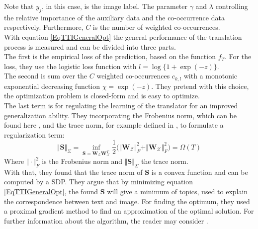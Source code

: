 Note that $y_j$, in this case, is the image label.
The parameter $\gamma$ and $\lambda$ controlling the relative importance of the auxiliary data and the co-occurrence data respectively.
Furthermore, $C$ is the number of weighted co-occurrences.\\
With equation \eqref{EqTTIGeneralOpt} the general performance of the translation process is measured and can be divided into three parts.\\
The first is the empirical loss of the prediction, based on the function $f_T$.\cite{Qi.2011}
For the loss, they use the logistic loss function with $l = \log\{1+\exp(-z) \}$.\\
The second is sum over the $C$ weighted co-occurrences $c_{k,l}$ with a monotonic exponential decreasing function $\chi = \exp(-z)$.
They pretend with this choice, the optimization problem is closed-form and is easy to optimize.\\
The last term is for regulating the learning of the translator for an improved generalization ability.
They incorporating the Frobenius norm, which can be found here \cite{Ma.1994}, and the trace norm, for example defined in \cite{Rennie.2005}, to formulate a regularization term:\cite{Qi.2011}
\begin{equation}\label{EqTTITrace}
\Vert \mathbf{S}\Vert_\Sigma = \inf_{\mathbf{S} = \mathbf{W}_\mathcal{Z} \mathbf{W}_\mathcal{X}^T} \frac{1}{2}\bigg(\Vert\mathbf{W}_\mathcal{Z}\Vert_F^2 + \Vert\mathbf{W}_\mathcal{X}\Vert_F^2 \bigg) = \Omega(T)
\end{equation}
Where $\Vert \cdot \Vert_F^2$ is the Frobenius norm and $\Vert \mathbf{S}\Vert_\Sigma$ the trace norm.\\
With that, they found that the trace norm of $\mathbf{S}$ is a convex function and can be computed by a \acl{SDP}.
They argue that by minimizing equation \eqref{EqTTIGeneralOpt}, the found $\mathbf{S}$ will give a minimum of topics, used to explain the correspondence between text and image.
For finding the optimum, they used a proximal gradient method to find an approximation of the optimal solution.
For further information about the algorithm, the reader may consider \cite{Qi.2011}.

